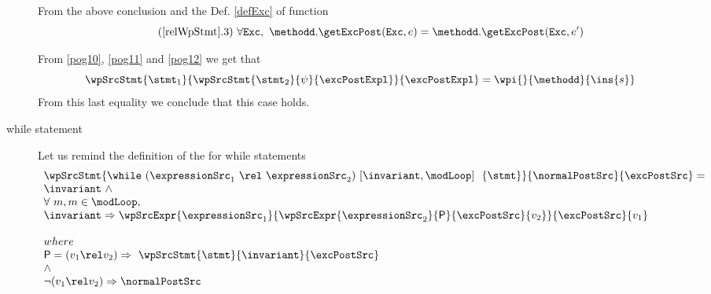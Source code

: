 \begin{description}
                From the above conclusion and the Def. \ref{defExc}  of function \getExcPost
                \begin{equation*} \label{pog12}    \tag{\ref{relWpStmt}.3} \               \forall \mbox{\rm\texttt{Exc}}, \ \methodd.\getExcPost(\mbox{\rm\texttt{Exc}}, e ) =  
                                                                                   \methodd.\getExcPost(\mbox{\rm\texttt{Exc}}, e' )  \end{equation*}
										   
		From   \eqref{pog10},   \eqref{pog11} and \eqref{pog12} we get that 	
		\begin{equation*}
			\wpSrcStmt{  \stmt_1  }{  \wpSrcStmt{  \stmt_2  }{   \psi }{\excPostExpl }    }{\excPostExpl} = \wpi{}{\methodd}{\ins{s}} 
		\end{equation*}
		From this last equality we conclude that this case holds.
		
	
      

  \item[while statement]
Let us remind the definition of the \wpName{} for  while statements
 \begin{equation*} %
 \begin{array}{l}\wpSrcStmt{ \while \ (\expressionSrc_1 \ \rel \ \expressionSrc_2 ) \ \lbrack \invariant, \modLoop \rbrack \  \do \ \{ \stmt \}}{ \normalPostSrc}{\excPostSrc}=\\
    \invariant \ \wedge\\
	       \forall \  m, m \in \modLoop , \\
	       \invariant \Rightarrow %
		     \wpSrcExpr{\expressionSrc_1}{
                     \wpSrcExpr{\expressionSrc_2}{  \mbox{\rm\textsf{P}} 		     
	       }{\excPostSrc } {v_2}}{\excPostSrc}{v_1}      %
     \\ \\
 where \\
\mbox{\rm\textsf{P}} =   		
		           ( v_1 \rel v_2 )        \Rightarrow \  \wpSrcStmt{ \stmt }{\invariant} {\excPostSrc} \\ 
                           \wedge\\  
		          \neg (v_1 \rel v_2)    \Rightarrow  \normalPostSrc
		     \end{array}
\end{equation*}
    

\end{description}

